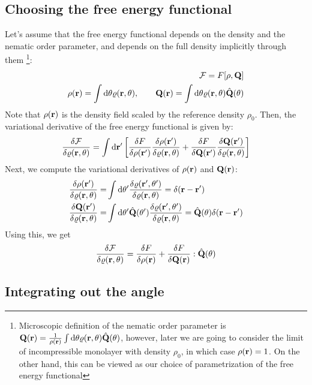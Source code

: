 \documentclass[a5paper]{article}
\begin{document}
\subsection{Choosing the free energy functional}
Let's assume that the free energy functional depends on the density and the nematic order parameter, and depends on the full density implicitly through them \footnote{
Microscopic definition of the nematic order parameter is $\mathbf{Q}(\mathbf{r}) =\frac{1}{\rho(\mathbf{r})} \int \mathrm{d}\theta \varrho(\mathbf{r}, \theta) \hat{\mathbf{Q}}(\theta)$, however, later we are going to consider the limit of incompressible monolayer with density $\rho_0$, in which case $\rho(\mathbf{r}) = 1$. On the other hand, this can be viewed as our choice of parametrization of the free energy functional}:
\begin{align}
    \mathcal{F} = F[\rho, \mathbf{Q}]
    \\
    \rho(\mathbf{r}) = \int \mathrm{d}\theta \varrho(\mathbf{r}, \theta),\qquad \mathbf{Q}(\mathbf{r}) = \int \mathrm{d}\theta \varrho(\mathbf{r}, \theta) \hat{\mathbf{Q}}(\theta)
\end{align}
Note that $\rho(\mathbf{r})$ is the density field scaled by the reference density $\rho_0$.
Then, the variational derivative of the free energy functional is given by:
\begin{align}
    \frac{\delta\mathcal{F}}{\delta\varrho(\mathbf{r}, \theta)} = \int \mathrm{d}\mathbf{r}' \left[
        \frac{\delta F}{\delta \rho(\mathbf{r}')} \frac{\delta \rho(\mathbf{r}')}{\delta\varrho(\mathbf{r}, \theta)} + \frac{\delta F}{\delta \mathbf{Q}(\mathbf{r}')} \frac{\delta \mathbf{Q}(\mathbf{r}')}{\delta\varrho(\mathbf{r}, \theta)}
    \right]
\end{align}
Next, we compute the variational derivatives of $\rho(\mathbf{r})$ and $\mathbf{Q}(\mathbf{r})$:
\begin{align}
    \frac{\delta \rho(\mathbf{r}')}{\delta\varrho(\mathbf{r}, \theta)} =& \int \mathrm{d}\theta' \frac{\delta \varrho(\mathbf{r}', \theta')}{\delta\varrho(\mathbf{r}, \theta)} = \delta(\mathbf{r}-\mathbf{r}') 
    \\
    \frac{\delta \mathbf{Q}(\mathbf{r}')}{\delta\varrho(\mathbf{r}, \theta)}=& 
    \int \mathrm{d}\theta' \hat{\mathbf{Q}}(\theta') \frac{\delta \varrho(\mathbf{r}', \theta')}{\delta\varrho(\mathbf{r}, \theta)}
    = \hat{\mathbf{Q}}(\theta)\delta(\mathbf{r}-\mathbf{r}') 
\end{align}
Using this, we get
\begin{align}
    \frac{\delta\mathcal{F}}{\delta\varrho(\mathbf{r}, \theta)} = \frac{\delta F}{\delta \rho(\mathbf{r})}  + \frac{\delta F}{\delta \mathbf{Q}(\mathbf{r})} : \hat{\mathbf{Q}}(\theta) 
\end{align}


\subsection{Integrating out the angle}
\end{document}
